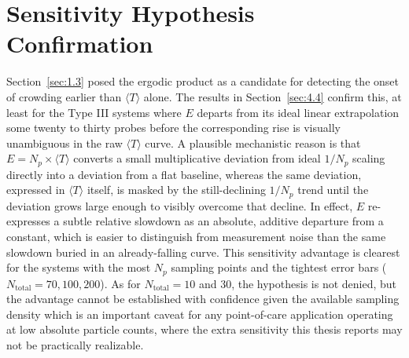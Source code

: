\section{Sensitivity Hypothesis Confirmation}
\label{sec:4.8}
Section~\ref{sec:1.3} posed the ergodic product as a candidate for detecting the onset of crowding earlier than $\langle T \rangle$ alone. The results in Section~\ref{sec:4.4} confirm this, at least for the Type III systems where $E$ departs from its ideal linear extrapolation some twenty to thirty probes before the corresponding rise is visually unambiguous in the raw $\langle T \rangle$ curve. A plausible mechanistic reason is that $E = N_p \times \langle T \rangle$ converts a small multiplicative deviation from ideal $1/N_p$ scaling directly into a deviation from a flat baseline, whereas the same deviation, expressed in $\langle T \rangle$ itself, is masked by the still-declining $1/N_p$ trend until the deviation grows large enough to visibly overcome that decline. In effect, $E$ re-expresses a subtle relative slowdown as an absolute, additive departure from a constant, which is easier to distinguish from measurement noise than the same slowdown buried in an already-falling curve. This sensitivity advantage is clearest for the systems with the most $N_p$ sampling points and the tightest error bars ($N_\text{total} = 70,100,200$). As for $N_\text{total} = 10$ and 30, the hypothesis is not denied, but the advantage cannot be established with confidence given the available sampling density which is an important caveat for any point-of-care application operating at low absolute particle counts, where the extra sensitivity this thesis reports may not be practically realizable.

